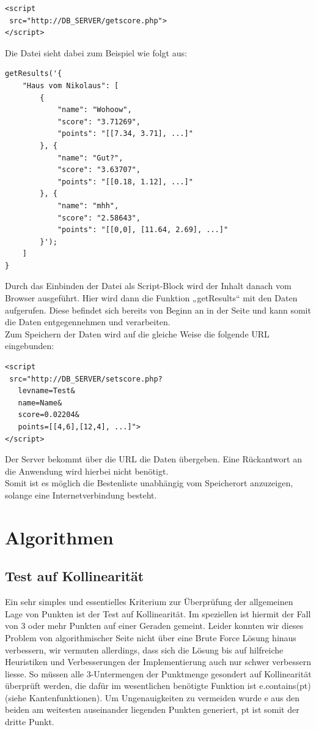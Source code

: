 \documentclass[a4paper,twocolumn]{scrartcl}
\newcommand{\lststyle}[1]{{\usefont{T1}{pcr}{m}{n}\small\selectfont#1}}
\begin{document}
\begin{lstlisting}
<script
 src="http://DB_SERVER/getscore.php">
</script>
\end{lstlisting}
Die Datei sieht dabei zum Beispiel wie folgt aus:

\newblock
\begin{lstlisting}
getResults('{
    "Haus vom Nikolaus": [
        {
            "name": "Wohoow",
            "score": "3.71269",
            "points": "[[7.34, 3.71], ...]"
        }, {
            "name": "Gut?",
            "score": "3.63707",
            "points": "[[0.18, 1.12], ...]"
        }, {
            "name": "mhh",
            "score": "2.58643",
            "points": "[[0,0], [11.64, 2.69], ...]"
        }');
    ]
}
\end{lstlisting}
\newblock
Durch das Einbinden der Datei als Script-Block wird der Inhalt danach vom Browser ausgeführt. Hier wird dann die Funktion „getResults“ mit den Daten aufgerufen. Diese befindet sich bereits von Beginn an in der Seite und kann somit die Daten entgegennehmen und verarbeiten.\\
Zum Speichern der Daten wird auf die gleiche Weise die folgende URL eingebunden:\\

\begin{lstlisting}
<script
 src="http://DB_SERVER/setscore.php?
   levname=Test&
   name=Name&
   score=0.02204&
   points=[[4,6],[12,4], ...]">
</script>
\end{lstlisting}
Der Server bekommt über die URL die Daten übergeben. Eine Rückantwort an die Anwendung wird hierbei nicht benötigt.\\
Somit ist es möglich die Bestenliste unabhängig vom Speicherort anzuzeigen, solange eine Internetverbindung besteht.


\section{Algorithmen}

\subsection{Test auf Kollinearität}
Ein sehr simples und essentielles Kriterium zur Überprüfung der allgemeinen Lage von Punkten ist der Test auf Kollinearität. Im speziellen ist hiermit der Fall von 3 oder mehr Punkten auf einer Geraden gemeint. Leider konnten wir dieses Problem von algorithmischer Seite nicht über eine Brute Force Lösung hinaus verbessern, wir vermuten allerdings, dass sich die Lösung bis auf hilfreiche Heuristiken und Verbesserungen der Implementierung auch nur schwer verbessern liesse. So müssen alle 3-Untermengen der Punktmenge gesondert auf Kollinearität überprüft werden, die dafür im wesentlichen benötigte Funktion ist \lststyle{e.contains(pt)} (siehe Kantenfunktionen). Um Ungenauigkeiten zu vermeiden wurde \lststyle{e} aus den beiden am weitesten auseinander liegenden Punkten generiert, \lststyle{pt} ist somit der dritte Punkt.  
\end{document}
